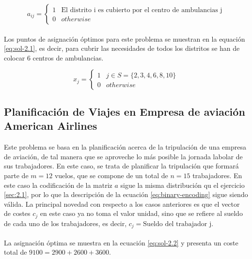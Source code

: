 \documentclass[spanish]{article}
\begin{document}
			\begin{equation}
			\label{eq:binary-encoding}
				a_{ij}  =
					\begin{cases}
		      	1 & \text{El distrito i es cubierto por el centro de ambulancias j}\\
		      	0 & otherwise
			   	\end{cases}
			\end{equation}

			\paragraph{}
			Los puntos de asignación óptimos para este problema se muestran en la equación \eqref{eq:sol-2.1}, es decir, para cubrir las necesidades de todos los distritos se han de colocar $6$ centros de ambulancias.

			\begin{equation}
			\label{eq:sol-2.1}
				x_{j} =
					\begin{cases}
		      	1 & j \in S = \{2,  3,  4,  6,  8,  10 \} \\
		      	0 & otherwise
			   	\end{cases}
			\end{equation}


		\subsection{Planificación de Viajes en Empresa de aviación American Airlines}
		\label{sec:2.2}

			\paragraph{}
			Este problema se basa en la planificación acerca de la tripulación de una empresa de aviación, de tal manera que se aproveche lo más posible la jornada labolar de sus trabajadores. En este caso, se trata de planificar la tripulación que formará parte de $m = 12$ vuelos, que se compone de un total de $n = 15$ trabajadores. En este caso la codificación de la matriz $a$ sigue la misma distribución qu el ejercicio \ref{sec:2.1}, por lo que la descripción de la ecuación \eqref{eq:binary-encoding} sigue siendo válida. La principal novedad con respecto a los casos anteriores es que el vector de costes $c_j$ en este caso ya no toma el valor unidad, sino que se refiere al sueldo de cada uno de los trabajadores, es decir, $c_j = \text{Sueldo del trabajador j}$.

			\paragraph{}
			La asignación óptima se muestra en la ecuación \eqref{eq:sol-2.2} y presenta un coste total de $9100 = 2900 + 2600 + 3600$.
\end{document}
